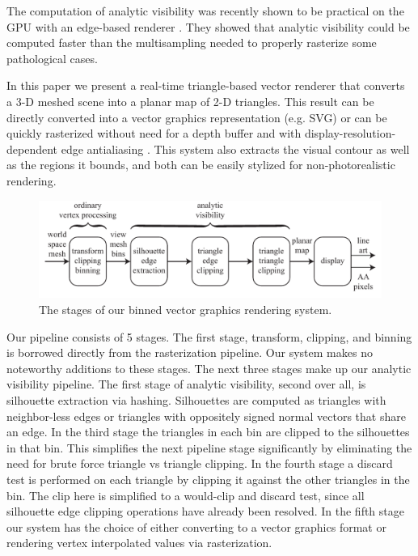 \documentclass[review]{acmsiggraph}
\begin{document}
The computation of analytic visibility was recently shown to be practical on
the GPU with an edge-based renderer \cite{auzinger2013}. They
showed that analytic visibility could be computed faster than the
multisampling needed to properly rasterize some pathological cases.

In this paper we present a real-time triangle-based vector renderer that
converts a 3-D meshed scene into a planar map of 2-D triangles. This result can
be directly converted into a vector graphics representation (e.g. SVG)
or can be quickly rasterized without need for a depth buffer and with
display-resolution-dependent edge antialiasing \cite{reshetov2009,jimenez2012}.
This system also extracts the visual contour as well as the regions it bounds,
and both can be easily stylized for non-photorealistic rendering.

\begin{figure}
\includegraphics{images/pipeline.pdf}
\caption{The stages of our binned vector graphics rendering system.}
\label{fig:pipeline}
\end{figure}

Our pipeline consists of 5 stages. The first stage, transform, clipping, and
binning is borrowed directly from the rasterization pipeline. Our system makes
no noteworthy additions to these stages. The next three stages make up our
analytic visibility pipeline. The first stage of analytic visibility, second
over all, is silhouette extraction via hashing. Silhouettes are computed as
triangles with neighbor-less edges or triangles with oppositely signed normal
vectors that share an edge. In the third stage the triangles in each bin are
clipped to the silhouettes in that bin.  This simplifies the next pipeline
stage significantly by eliminating the need for brute force triangle vs
triangle clipping. In the fourth stage a discard test is performed on each
triangle by clipping it against the other triangles in the bin. The clip here
is simplified to a would-clip and discard test, since all silhouette edge
clipping operations have already been resolved. In the fifth stage our system
has the choice of either converting to a vector graphics format or rendering
vertex interpolated values via rasterization.
\end{document}
